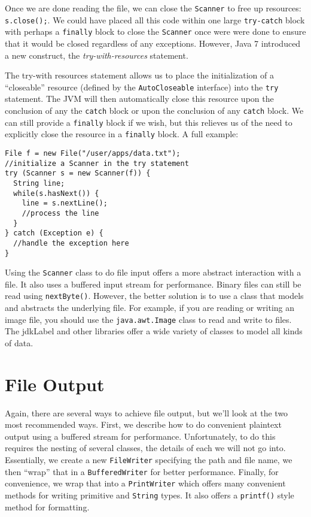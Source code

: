 Once we are done reading the file, we can close the 
\texttt{Scanner} to free up resources:
\texttt{s.close();}.  We could have placed
all this code within one large \texttt{try-catch}
block with perhaps a \texttt{finally} block
to close the \texttt{Scanner} once were were
done to ensure that it would be closed regardless of
any exceptions.  However, Java 7 introduced a new 
construct, the \emph{try-with-resources} statement.

The try-with resources statement allows us to place
the initialization of a ``closeable'' resource (defined
by the \texttt{AutoCloseable} interface) into
the \texttt{try} statement.  The JVM will then
automatically close this resource upon the conclusion of
any the \texttt{catch} block or upon the conclusion
of any \texttt{catch} block.  We can still provide
a \texttt{finally} block if we wish, but this 
relieves us of the need to explicitly close the resource
in a \texttt{finally} block.  A full example:

\begin{verbatim}
File f = new File("/user/apps/data.txt");
//initialize a Scanner in the try statement
try (Scanner s = new Scanner(f)) {
  String line;
  while(s.hasNext()) {
    line = s.nextLine();
	//process the line
  }
} catch (Exception e) {
  //handle the exception here
}
\end{verbatim}

Using the \texttt{Scanner} class to do file 
input offers a more abstract interaction with a file.  
It also uses a buffered input stream for performance.
Binary files can still be read using \texttt{nextByte()}.
However, the better solution is to use a class that
models and abstracts the underlying file.  For example, 
if you are reading or writing an image file, you should
use the \texttt{java.awt.Image} class to
read and write to files.  The \gls{jdkLabel} and other
libraries offer a wide variety of classes to model all
kinds of data.

\section{File Output}

Again, there are several ways to achieve file output, 
but we'll look at the two most recommended ways.  First,
we describe how to do convenient plaintext output 
using a buffered stream for performance.  Unfortunately,
to do this requires the nesting of several classes,
the details of each we will not go into.  Essentially,
we create a new \texttt{FileWriter} specifying
the path and file name, we then ``wrap'' that in a
\texttt{BufferedWriter} for better performance.
Finally, for convenience, we wrap that into a 
\texttt{PrintWriter} which offers many convenient
methods for writing primitive and \texttt{String} 
types.  It also offers a \texttt{printf()} style
method for formatting.

